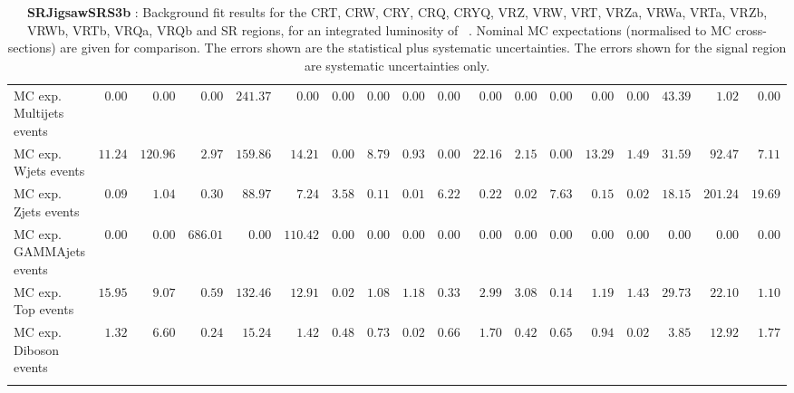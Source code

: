 \begin{table}
{\begin{tabular*}{\textwidth}{@{\extracolsep{\fill}}lrrrrrrrrrrrrrrrrr}
\noalign{\smallskip}\hline\noalign{\smallskip}
        MC exp. Multijets events         & $0.00$          & $0.00$          & $0.00$          & $241.37$          & $0.00$          & $0.00$          & $0.00$          & $0.00$          & $0.00$          & $0.00$          & $0.00$          & $0.00$          & $0.00$          & $0.00$          & $43.39$          & $1.02$          & $0.00$              \\
        MC exp. Wjets events         & $11.24$          & $120.96$          & $2.97$          & $159.86$          & $14.21$          & $0.00$          & $8.79$          & $0.93$          & $0.00$          & $22.16$          & $2.15$          & $0.00$          & $13.29$          & $1.49$          & $31.59$          & $92.47$          & $7.11$              \\
        MC exp. Zjets events         & $0.09$          & $1.04$          & $0.30$          & $88.97$          & $7.24$          & $3.58$          & $0.11$          & $0.01$          & $6.22$          & $0.22$          & $0.02$          & $7.63$          & $0.15$          & $0.02$          & $18.15$          & $201.24$          & $19.69$              \\
        MC exp. GAMMAjets events         & $0.00$          & $0.00$          & $686.01$          & $0.00$          & $110.42$          & $0.00$          & $0.00$          & $0.00$          & $0.00$          & $0.00$          & $0.00$          & $0.00$          & $0.00$          & $0.00$          & $0.00$          & $0.00$          & $0.00$              \\
        MC exp. Top events         & $15.95$          & $9.07$          & $0.59$          & $132.46$          & $12.91$          & $0.02$          & $1.08$          & $1.18$          & $0.33$          & $2.99$          & $3.08$          & $0.14$          & $1.19$          & $1.43$          & $29.73$          & $22.10$          & $1.10$              \\
        MC exp. Diboson events         & $1.32$          & $6.60$          & $0.24$          & $15.24$          & $1.42$          & $0.48$          & $0.73$          & $0.02$          & $0.66$          & $1.70$          & $0.42$          & $0.65$          & $0.94$          & $0.02$          & $3.85$          & $12.92$          & $1.77$              \\
\noalign{\smallskip}\hline\noalign{\smallskip}
\end{tabular*}
}
\caption{{\bf SRJigsawSRS3b} : Background fit results for the CRT, CRW, CRY, CRQ, CRYQ, VRZ, VRW, VRT, VRZa, VRWa, VRTa, VRZb, VRWb, VRTb, VRQa, VRQb and SR regions, for an integrated luminosity of \ourintlumi~\ifb. Nominal MC expectations (normalised to MC cross-sections) are given for comparison. The errors shown are the statistical plus systematic uncertainties. The errors shown for the signal region are systematic uncertainties only.}
\label{table.results.systematics.in.logL.fit.CRT.CRW.CRY.CRQ.CRYQ.VRZ.VRW.VRT.VRZa.VRWa.VRTa.VRZb.VRWb.VRTb.VRQa.VRQb.SR.SRJigsawSRS3b}
\end{table}
%